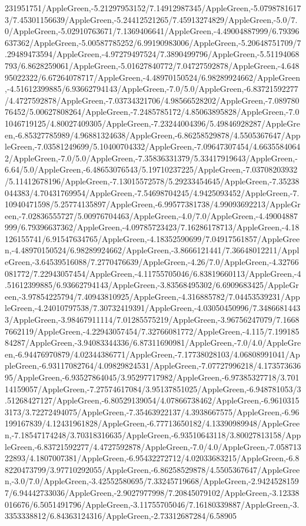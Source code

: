 {\begin{tikzternal}
231951751/AppleGreen,-5.21297953152/7.14912987345/AppleGreen,-5.07987816173/7.45301156639/AppleGreen,-5.24412521265/7.45913274829/AppleGreen,-5.0/7.0/AppleGreen,-5.02910763671/7.1369406641/AppleGreen,-4.49004887999/6.79396637362/AppleGreen,-5.00587785252/6.99190983006/AppleGreen,-5.20648751709/7.29489473594/AppleGreen,-4.97279497524/7.3890499796/AppleGreen,-5.51194068793/6.8628259061/AppleGreen,-5.01627840772/7.04727592878/AppleGreen,-4.64895022322/6.67264078717/AppleGreen,-4.48970150524/6.98289924662/AppleGreen,-4.51612399885/6.93662794143/AppleGreen,-7.0/5.0/AppleGreen,-6.83721592277/4.4727592878/AppleGreen,-7.03734321706/4.98566528202/AppleGreen,-7.08978076452/5.00627808264/AppleGreen,-7.2485785172/4.85063895828/AppleGreen,-7.01046719125/4.80027409305/AppleGreen,-7.23244004396/5.49846928287/AppleGreen,-6.85327785989/4.96881324638/AppleGreen,-6.86258529878/4.5505367647/AppleGreen,-7.03581249699/5.10400704332/AppleGreen,-7.09647307454/4.66355840642/AppleGreen,-7.0/5.0/AppleGreen,-7.35836331379/5.33417919643/AppleGreen,-6.64/5.0/AppleGreen,-6.48653076543/5.19710237225/AppleGreen,-7.03708203932/5.11412678196/AppleGreen,-7.13015572578/5.29233454645/AppleGreen,-7.35238044383/4.70431769954/AppleGreen,-7.54698704245/4.9425093452/AppleGreen,-7.10940471598/5.25774135897/AppleGreen,-6.99577381738/4.99093692213/AppleGreen,-7.02836555727/5.00976704463/AppleGreen,-4.0/7.0/AppleGreen,-4.49004887999/6.79396637362/AppleGreen,-4.09785723423/7.16286178713/AppleGreen,-4.18126155741/6.91547634765/AppleGreen,-4.18352590699/7.04917561857/AppleGreen,-4.48970150524/6.98289924662/AppleGreen,-3.8666121441/7.36648012211/AppleGreen,-3.64539516088/7.2770476639/AppleGreen,-4.26/7.0/AppleGreen,-4.32766081772/7.22943057454/AppleGreen,-4.11755705046/6.83819660113/AppleGreen,-4.51612399885/6.93662794143/AppleGreen,-3.83568495302/6.6909683425/AppleGreen,-3.97854225794/7.40943810925/AppleGreen,-4.316885782/7.04453539231/AppleGreen,-4.24010797538/7.30732419391/AppleGreen,-4.03050450996/7.34866814433/AppleGreen,-3.98467911114/7.01285575219/AppleGreen,-3.96756247079/7.16687662119/AppleGreen,-4.22943057454/7.32766081772/AppleGreen,-4.115/7.19918584287/AppleGreen,-3.94083344336/6.87311690981/AppleGreen,-7.0/4.0/AppleGreen,-6.94476970879/4.02344386771/AppleGreen,-7.17738028103/4.06808991041/AppleGreen,-6.93117082764/4.09829824531/AppleGreen,-7.07727996218/4.17357363695/AppleGreen,-6.93527864045/3.95297717982/AppleGreen,-6.97385327718/3.70114159057/AppleGreen,-7.27574617084/3.95137851025/AppleGreen,-6.948781053/3.51268427127/AppleGreen,-6.80529139054/4.07866738462/AppleGreen,-6.96103153173/3.72272494075/AppleGreen,-7.35463922137/4.3938667575/AppleGreen,-6.96199167839/4.12431961828/AppleGreen,-6.77713650182/4.13390989948/AppleGreen,-7.18547174248/3.70318316635/AppleGreen,-6.93510643118/3.80027813158/AppleGreen,-6.83721592277/4.4727592878/AppleGreen,-7.0/4.0/AppleGreen,-7.05871322893/4.1807007381/AppleGreen,-6.95432272712/4.02033683215/AppleGreen,-6.88220473799/3.97710292055/AppleGreen,-6.86258529878/4.5505367647/AppleGreen,-3.0/7.0/AppleGreen,-3.42552580695/7.33245719668/AppleGreen,-2.94245281597/6.94442733036/AppleGreen,-2.9027977998/7.20845079102/AppleGreen,-3.12338016676/6.5051491796/AppleGreen,-3.11755705046/7.16180339887/AppleGreen,-3.3353338812/6.84363124316/AppleGreen,-2.73312687284/6.58905
\end{tikzternal}}
